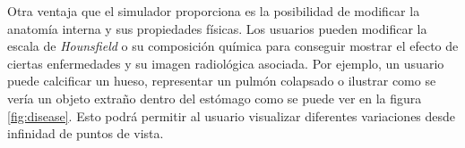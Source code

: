 Otra ventaja que el simulador proporciona es la posibilidad de modificar la anatomía interna y sus propiedades físicas. Los usuarios pueden modificar la escala de \emph{Hounsfield} o su composición química para conseguir mostrar el efecto de ciertas enfermedades y su imagen radiológica asociada. Por ejemplo, un usuario puede calcificar un hueso, representar un pulmón colapsado o ilustrar como se vería un objeto extraño dentro del estómago como se puede ver en la figura \ref{fig:disease}. Esto podrá permitir al usuario visualizar diferentes variaciones desde infinidad de puntos de vista.



